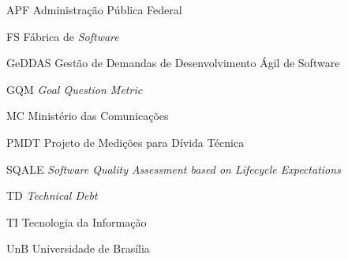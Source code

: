 \begin{siglas}
  \item[APF] Administração Pública Federal
  \item[FS] Fábrica de \textit{Software}
  \item[GeDDAS] Gestão de Demandas de Desenvolvimento Ágil de Software
  \item[GQM] \textit{Goal Question Metric}
  \item[MC] Ministério das Comunicações
  \item[PMDT] Projeto de Medições para Dívida Técnica
  \item[SQALE] \textit{Software Quality Assessment based on Lifecycle Expectations}
  \item[TD] \textit{Technical Debt}
  \item[TI] Tecnologia da Informação
  \item[UnB] Universidade de Brasília
\end{siglas}
